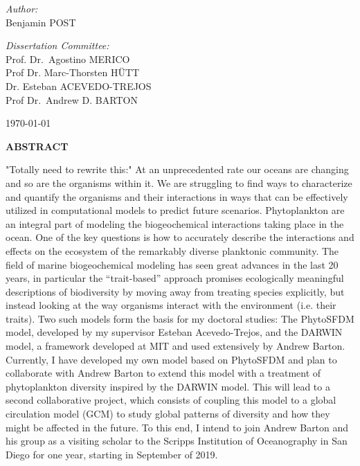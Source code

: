 \begin{titlepage}
\begin{center}
\vspace{3cm}
\begin{minipage}{0.4\textwidth}
\begin{flushleft} 
\emph{Author:}\\
Benjamin \MakeUppercase{Post}
\end{flushleft}
\end{minipage}
\begin{minipage}{0.4\textwidth}
\begin{flushright} 
\emph{Dissertation Committee:} \\
Prof. Dr.~Agostino \MakeUppercase{Merico}\\
Prof Dr. Marc-Thorsten \MakeUppercase{Hütt}\\
Dr. Esteban \MakeUppercase{Acevedo-Trejos}\\
Prof Dr.~Andrew D. \MakeUppercase{Barton}\\
\end{flushright}
\end{minipage}

\vspace{2cm}

{\today}

\end{center}


\large 
\textbf{ABSTRACT} \\

\normalsize

"Totally need to rewrite this:" At an unprecedented rate our oceans are changing and so are the organisms within it. We are struggling to find ways to characterize and quantify the organisms and their interactions in ways that can be effectively utilized in computational models to predict future scenarios. Phytoplankton are an integral part of modeling the biogeochemical interactions taking place in the ocean. One of the key questions is how to accurately describe the interactions and effects on the ecosystem of the remarkably diverse planktonic community. The field of marine biogeochemical modeling has seen great advances in the last 20 years, in particular the “trait-based” approach promises ecologically meaningful descriptions of biodiversity by moving away from treating species explicitly, but instead looking at the way organisms interact with the environment (i.e. their traits). Two such models form the basis for my doctoral studies: The PhytoSFDM model, developed by my supervisor Esteban Acevedo-Trejos, and the DARWIN model, a framework developed at MIT and used extensively by Andrew Barton. 
Currently, I have developed my own model based on PhytoSFDM and plan to collaborate with Andrew Barton to extend this model with a treatment of phytoplankton diversity inspired by the DARWIN model. This will lead to a second collaborative project, which consists of coupling this model to a global circulation model (GCM) to study global patterns of diversity and how they might be affected in the future. To this end, I intend to join Andrew Barton and his group as a visiting scholar to the Scripps Institution of Oceanography in San Diego for one year, starting in September of 2019.

\end{titlepage}